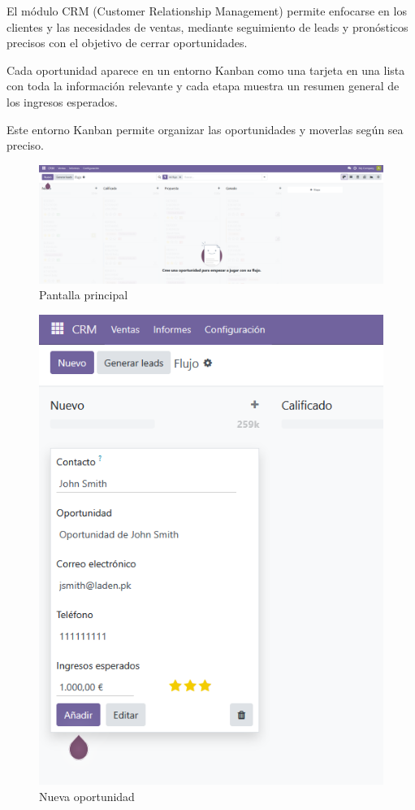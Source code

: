 \documentclass[a4paper,12pt]{article}
\begin{document}
El módulo CRM (Customer Relationship Management) permite enfocarse en los clientes y las necesidades de ventas, mediante seguimiento de leads y pronósticos precisos con el objetivo de cerrar oportunidades.

Cada oportunidad aparece en un entorno Kanban como una tarjeta en una lista con toda la información relevante y cada etapa muestra un resumen general de los ingresos esperados.

Este entorno Kanban permite organizar las oportunidades y moverlas según sea preciso.

\begin{figure}[h!]
    \centering
    \includegraphics[width=1\textwidth]{pr2odoo66-pantallaPrincipal.png}
    \caption{Pantalla principal}
\end{figure}
\FloatBarrier

\begin{figure}[h!]
    \centering
    \includegraphics[width=1\textwidth]{pr2odoo67-nuevaOportunidad.png}
    \caption{Nueva oportunidad}
\end{figure}
\FloatBarrier
\end{document}
